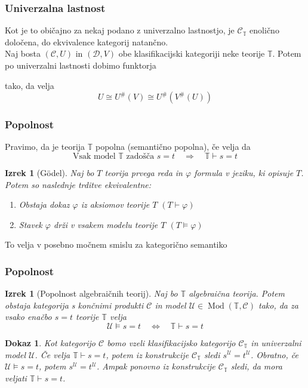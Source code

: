 \documentclass{beamer}
\DeclareMathOperator{\Mod}{Mod}
\newtheorem{izrek}[theorem]{Izrek}
\newtheorem{dokaz}[theorem]{Dokaz}
\begin{document}
\begin{frame}[fragile]
\frametitle{Univerzalna lastnost}
Kot je to običajno za nekaj podano z univerzalno lastnostjo, je $\mathcal{C}_\mathbb{T}$ enolično določena, do ekvivalence kategorij natančno. \\
\vspace{1cm}
\pause
Naj bosta $(\mathcal{C}, U)$ in $(\mathcal{D}, V)$ obe klasifikacijski kategoriji neke teorije $\mathbb{T}$. Potem po univerzalni lastnosti dobimo funktorja
\begin{center}
\end{center}
tako, da velja
$$U \cong U^{\#}(V) \cong U^{\#}(V^{\#}(U))$$
\end{frame}

\begin{frame}
\frametitle{Popolnost}
Pravimo, da je teorija $\mathbb{T}$ popolna (semantično popolna), če velja da
$$\text{Vsak model } \mathbb{T} \text{ zadošča }s=t \quad \Longrightarrow \quad \mathbb{T} \vdash s = t$$
\begin{izrek}[Gödel]
Naj bo $T$ teorija prvega reda in $\varphi$ formula v jeziku, ki opisuje $T$. Potem so naslednje trditve ekvivalentne:
\begin{enumerate}
\item Obstaja dokaz $\varphi$ iz aksiomov teorije $T$ $(T \vdash \varphi)$
\item Stavek $\varphi$ drži v vsakem modelu teorije $T$ $(T \models \varphi)$
\end{enumerate}
\end{izrek}
\pause
To velja v posebno močnem smislu za kategorično semantiko

\end{frame}

\begin{frame}
\frametitle{Popolnost}
\begin{izrek}[Popolnost algebraičnih teorij]
Naj bo $\mathbb{T}$ algebraična teorija. Potem obstaja kategorija s končnimi produkti $\mathcal{C}$ in model $\mathcal{U} \in \Mod(\mathbb{T}, \mathcal{C})$ tako, da za vsako enačbo $s = t$ teorije $\mathbb{T}$ velja
$$\mathcal{U} \models s = t \quad \Longleftrightarrow \quad \mathbb{T} \vdash s = t$$
\end{izrek}
\begin{dokaz}
Kot kategorijo $\mathcal{C}$ bomo vzeli klasifikacijsko kategorijo $\mathcal{C}_\mathbb{T}$ in univerzalni model $\mathcal{U}$. Če velja $\mathbb{T} \vdash s = t$, potem iz konstrukcije $\mathcal{C}_\mathbb{T}$ sledi $s^\mathcal{U} = t^\mathcal{U}$. Obratno, če $\mathcal{U} \models s = t$, potem $s^\mathcal{U} = t^\mathcal{U}$. Ampak ponovno iz konstrukcije $\mathcal{C}_\mathbb{T}$ sledi, da mora veljati $\mathbb{T} \vdash s = t$.
\end{dokaz}
\end{frame}
\end{document}
